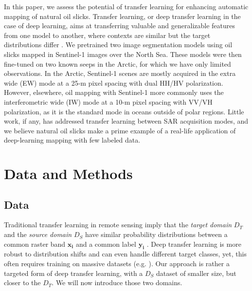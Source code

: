 \documentclass[lettersize,journal]{IEEEtran}
\begin{document}
In this paper, we assess the potential of transfer learning for enhancing automatic mapping of natural oil slicks. Transfer learning, or deep transfer learning in the case of deep learning, aims at 
transferring valuable and generalizable features from one model to another, where contexts are similar but the target distributions differ \cite{goodfellowDeepLearning2016}. 
We pretrained two image segmentation models using oil slicks mapped in Sentinel-1 images over the North Sea. These models were then fine-tuned on two known seeps in the Arctic, for which we have only 
limited observations. In the Arctic, Sentinel-1 scenes are mostly acquired in the extra wide (EW) mode at a 25-m pixel spacing with dual HH/HV polarization. However, elsewhere, oil mapping with Sentinel-1 more 
commonly uses the interferometric wide (IW) mode at a 10-m pixel spacing with VV/VH polarization, as it is the standard mode in oceans outside of polar regions.
Little work, if any, has addressed transfer learning between SAR acquisition modes, and we believe natural oil slicks make a prime example of a real-life application of deep-learning mapping with few labeled data. 

\section{Data and Methods}
\subsection{Data}
Traditional transfer learning in remote sensing imply that the \textit{target domain} $\mathit{D}_T$ and the \textit{source domain} $\mathit{D}_S$ have similar probability distributions between a common raster band
$\mathbf{x_i}$ and a common label $\mathbf{y_i}$ \cite{tuiaDomainAdaptationClassification2016}. Deep transfer learning is more robust to distribution shifts and can even handle different target classes, yet, this often 
requires training on massive datasets (e.g. \cite{heDeepResidualLearning2015,kirillovSegmentAnything2023}). 
Our approach is rather a targeted form of deep transfer learning, with a $\mathit{D}_S$ dataset of smaller size, but closer to the $\mathit{D}_T$. We will now introduce those two domains.
\end{document}
